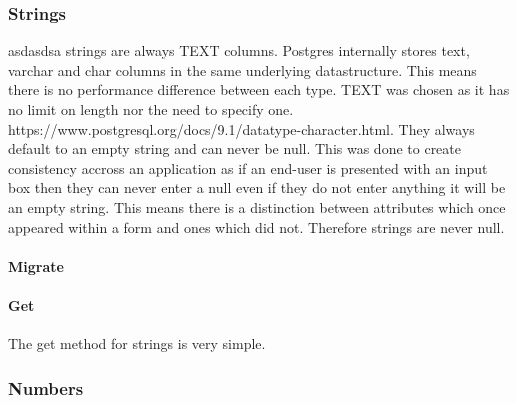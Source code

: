 \documentclass[
  12pt,
]{article}
\let\oldparagraph\paragraph
\renewcommand{\paragraph}[1]{\oldparagraph{#1}\mbox{}}
\begin{document}
\hypertarget{strings-1}{%
\subsubsection{Strings}\label{strings-1}}

asdasdsa strings are always TEXT columns. Postgres internally stores
text, varchar and char columns in the same underlying datastructure.
This means there is no performance difference between each type. TEXT
was chosen as it has no limit on length nor the need to specify one.
https://www.postgresql.org/docs/9.1/datatype-character.html. They always
default to an empty string and can never be null. This was done to
create consistency accross an application as if an end-user is presented
with an input box then they can never enter a null even if they do not
enter anything it will be an empty string. This means there is a
distinction between attributes which once appeared within a form and
ones which did not. Therefore strings are never null.

\hypertarget{migrate}{%
\paragraph{Migrate}\label{migrate}}

\hypertarget{get}{%
\paragraph{Get}\label{get}}

The get method for strings is very simple.

\hypertarget{numbers-1}{%
\subsubsection{Numbers}\label{numbers-1}}
\end{document}
